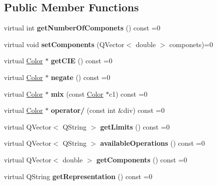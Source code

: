 \subsection*{Public Member Functions}
\begin{DoxyCompactItemize}
\item 
\mbox{\label{class_color_a0e16ae80374851824e791a941c6315e1}} 
virtual int {\bfseries get\+Number\+Of\+Componets} () const =0
\item 
\mbox{\label{class_color_a84ee279d59516539f2940a424018c376}} 
virtual void {\bfseries set\+Components} (Q\+Vector$<$ double $>$ componets)=0
\item 
\mbox{\label{class_color_a5d360ee273c34bceb8dd5837489a0a18}} 
virtual \hyperlink{class_color}{Color} $\ast$ {\bfseries get\+C\+IE} () const =0
\item 
\mbox{\label{class_color_aa73035295e3e42593b11904c398f1657}} 
virtual \hyperlink{class_color}{Color} $\ast$ {\bfseries negate} () const =0
\item 
\mbox{\label{class_color_ab240ddb0e1d4779703f6b2ee35a8a0e9}} 
virtual \hyperlink{class_color}{Color} $\ast$ {\bfseries mix} (const \hyperlink{class_color}{Color} $\ast$c1) const =0
\item 
\mbox{\label{class_color_acb25591213c391f682c9261c85dc111c}} 
virtual \hyperlink{class_color}{Color} $\ast$ {\bfseries operator/} (const int \&div) const =0
\item 
\mbox{\label{class_color_a4880c6f39c155008b711c056b21ff31b}} 
virtual Q\+Vector$<$ Q\+String $>$ {\bfseries get\+Limits} () const =0
\item 
\mbox{\label{class_color_af521a40fabd5e4718ada6531fc20ec58}} 
virtual Q\+Vector$<$ Q\+String $>$ {\bfseries available\+Operations} () const =0
\item 
\mbox{\label{class_color_a0c30989b24589c8725abe286cc5e7a23}} 
virtual Q\+Vector$<$ double $>$ {\bfseries get\+Components} () const =0
\item 
\mbox{\label{class_color_a45ec07f1486ab8259cdd8630c804b9f6}} 
virtual Q\+String {\bfseries get\+Representation} () const =0
\end{DoxyCompactItemize}

